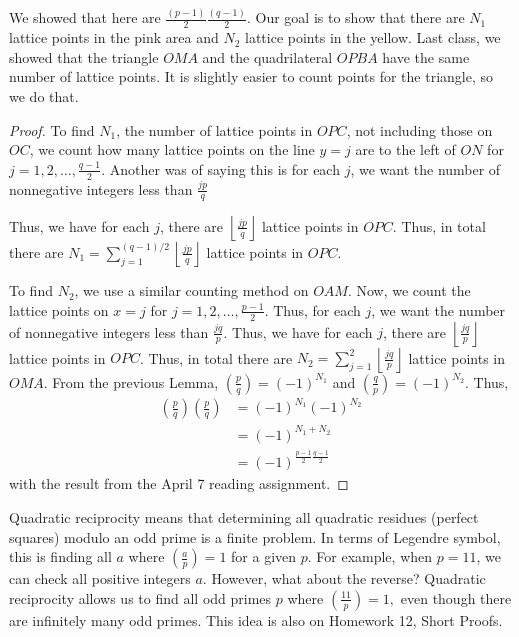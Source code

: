 \documentclass[letterpaper, 11 pt]{article}
\begin{document}
We showed that here are $\frac{(p-1)}{2}\frac{(q-1)}{2}$. Our goal is to show that there are $N_1$ lattice points in the pink area and $N_2$ lattice points in the yellow. Last class, we showed that the triangle $OMA$ and the quadrilateral $OPBA$ have the same number of lattice points. It is slightly easier to count points for the triangle, so we do that.

\begin{proof}
To find $N_1$, the number of lattice points in $OPC$, not including those on $OC$, we count how many lattice points on the line $y=j$ are to the left of $ON$ for $j=1,2,\dots,\frac{q-1}{2}$. Another was of saying this is for each $j$, we want the number of nonnegative integers less than    {$\frac{jp}{q}$}

Thus, we have for each $j$, there are 
{$\left\lfloor\frac{jp}{q}\right\rfloor$} 
lattice points in $OPC$. Thus, in total there are $N_1=\displaystyle\sum_{j=1}^{(q-1)/2}\left\lfloor\frac{jp}{q}\right\rfloor$ lattice points in $OPC$.


To find $N_2$, we use a similar counting method on $OAM$. Now, we count the lattice points on $x=j$ for $j=1,2,\dots,\frac{p-1}{2}$. Thus, for each $j$, we want the number of nonnegative integers less than     {$\frac{jq}{p}$}. Thus, we have for each $j$, there are    {$\left\lfloor\frac{jq}{p}\right\rfloor$}
lattice points in $OPC$. Thus, in total there are  $N_2=  \displaystyle\sum_{j=1}^{2
}\left\lfloor\frac{jq}{p}\right\rfloor$ lattice points in $OMA$.
From the previous Lemma, $\left(\frac{p}{q}\right)=(-1)^{N_1}$ and $\left(\frac{q}{p}\right)=(-1)^{N_2}$. Thus, 
\begin{align*}
 \left(\frac{p}{q}\right)\left(\frac{p}{q}\right)&=(-1)^{N_1} (-1)^{N_2} \\
 &=(-1)^{N_1+N_2}\\
&=(-1)^{\frac{p-1}{2}\frac{q-1}{2}}
\end{align*}
with the result from the April 7 reading assignment.
\end{proof}

Quadratic reciprocity means that determining all quadratic residues (perfect squares) modulo an odd prime is a finite problem. In terms of Legendre symbol, this is finding all $a$ where $\left(\frac{a}{p}\right)=1$ for a given $p$. For example, when $p=11$, we can check all positive integers $a$. However, what about the reverse? Quadratic reciprocity allows us to find all odd primes $p$ where $\left(\frac{11}{p}\right)=1,$ even though there are infinitely many odd primes. This idea is also on Homework 12, Short Proofs.
\end{document}
